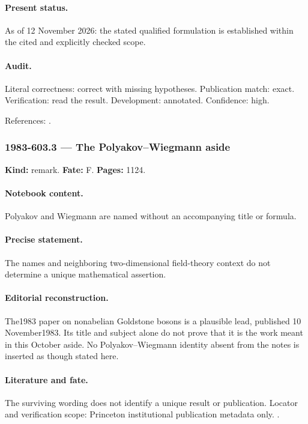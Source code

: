 \paragraph{Present status.} As of 12 November 2026: the stated qualified formulation is established within the cited and explicitly checked scope.

\paragraph{Audit.} Literal correctness: correct with missing hypotheses. Publication match: exact. Verification: read the result. Development: annotated. Confidence: high.

\noindent References: \citep{witten1982anomaly,wangwenwitten2019new}.\par

\subsubsection{1983-603.3 --- The Polyakov--Wiegmann aside}

\label{item:1983-603.3}

\noindent\textbf{Kind:} remark. \textbf{Fate:} F. \textbf{Pages:} 1124.\par

\paragraph{Notebook content.} Polyakov and Wiegmann are named without an accompanying title or formula.

\paragraph{Precise statement.} The names and neighboring two-dimensional field-theory context do not determine a unique mathematical assertion.

\paragraph{Editorial reconstruction.} The1983 paper on nonabelian Goldstone bosons is a plausible lead, published 10 November1983. Its title and subject alone do not prove that it is the work meant in this October aside. No Polyakov--Wiegmann identity absent from the notes is inserted as though stated here.

\paragraph{Literature and fate.} The surviving wording does not identify a unique result or publication. Locator and verification scope: Princeton institutional publication metadata only. \cite{polyakovwiegmann1983goldstone}.

